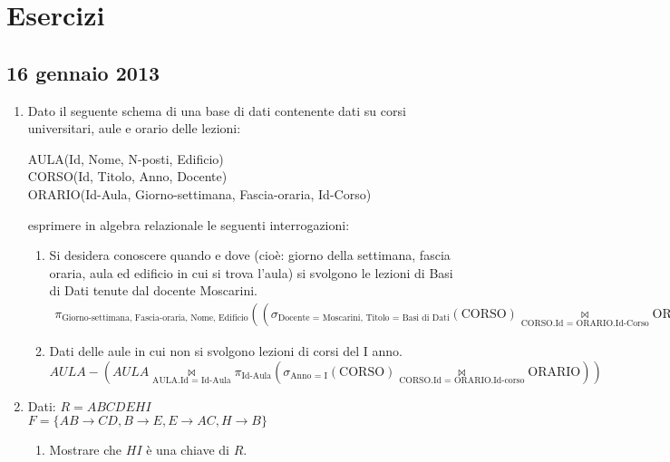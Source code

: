 \chapter{Esercizi}

\section{16 gennaio 2013}

\begin{enumerate}
    \item Dato il seguente schema di una base di dati contenente dati su corsi universitari, aule e orario delle lezioni:

    AULA(Id, Nome, N-posti, Edificio)  \\
    CORSO(Id, Titolo, Anno, Docente) \\
    ORARIO(Id-Aula, Giorno-settimana, Fascia-oraria, Id-Corso)

    esprimere in algebra relazionale le seguenti interrogazioni:

    \begin{enumerate}
        \item Si desidera conoscere quando e dove  (cio\`e: giorno della settimana, fascia oraria, aula ed edificio in cui si trova l'aula) si svolgono le  lezioni di Basi di Dati tenute dal docente Moscarini.
        \begin{align*}
        \pi_{\text{Giorno-settimana, Fascia-oraria, Nome, Edificio}}
        ((\sigma_{\text{Docente = Moscarini, Titolo = Basi di Dati}} (\text{CORSO})
        \underset{\text{CORSO.Id = ORARIO.Id-Corso}}{\Join} \text{ORARIO})
        \underset{\text{ORARIO.Id-Aula = AULA.Id}}{\Join} \text{AULA})
        \end{align*}
        \item Dati delle aule in cui non si svolgono lezioni di corsi del I anno.
        \[
        AULA -
        (AULA
        \underset{\text{AULA.Id = Id-Aula}}{\Join}
        \pi_{\text{Id-Aula}}
        (\sigma_{\text{Anno = I}} (\text{CORSO})
        \underset{\text{CORSO.Id = ORARIO.Id-corso}}{\Join}
        \text{ORARIO}))
        \]
    \end{enumerate}
    \item Dati:
    $R = ABCDEHI$ \\ 
    $F = \{ AB \to CD, B \to E, E \to AC, H \to B \}$
    \begin{enumerate}
        \item Mostrare che  $HI$ \`e una chiave di $R$.


\end{enumerate}
\end{enumerate}
